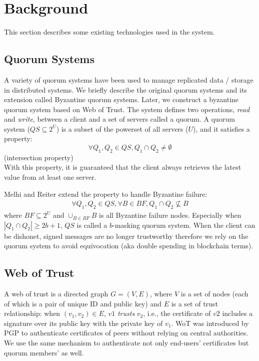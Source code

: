 \section{Background}
This section describes some existing technologies used in the system.

\subsection{Quorum Systems}
A variety of quorum systems have been used to manage replicated data /
storage in distributed systems. We briefly describe the original
quorum systems and its extension called Byzantine quorum
systems. Later, we construct a byzantine quorum system based on Web of
Trust.
The system defines two operations, {\em read} and {\em write}, between
a client and a set of servers called a quorum. A quorum system ($QS
\subseteq 2^U$) is a subset of the powerset of all servers ($U$), and
it satisfies a property:
\[
  \forall Q_1, Q_2 \in QS, Q_1 \cap Q_2 \neq \emptyset
\]
\hfill (intersection property)\\

With this property, it is guaranteed that the client always retrieves
the latest value from at least one server.

Melhi and Reiter \cite{Delhi:1} extend the property to handle
Byzantine failure:
\begin{align*}
  \forall Q_1, Q_2 \in QS, \forall B \in BF, Q_1 \cap Q_2 \nsubseteq B
\end{align*}
where $BF \subseteq 2^U$ and $\cup_{B \in BF} B$ is all Byzantine
failure nodes.
Especially when $|Q_1 \cap Q_2| \geq 2b+1$, $QS$ is called a $b$-masking
quorum system. When the client can be dishonet, signed messages are no
longer trustworthy therefore we rely on the quorum system to avoid
equivocation (aka double spending in blockchain terms).

\subsection{Web of Trust}
A web of trust is a directed graph $G = (V, E)$, where $V$ is a set of
nodes (each of which is a pair of unique ID and public key) and $E$ is a
set of trust relationship: when $(v_1, v_2) \in E$, $v1$ {\em trusts}
$v_2$,
i.e., the certificate of $v2$ includes a signature over its public key
with the private key of $v_1$. WoT was introduced by PGP to
authenticate certificates of peers without relying on central
authorities. We use the same mechanism to authenticate not only
end-users' certificates but quorum members' as well.

